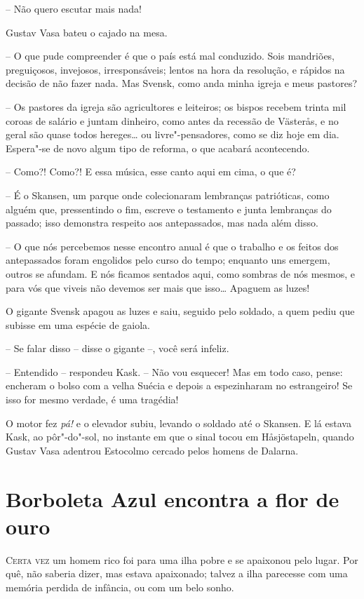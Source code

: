 -- Não quero escutar mais nada!

Gustav Vasa bateu o cajado na mesa.

-- O que pude compreender é que o país está mal conduzido. Sois
mandriões, preguiçosos, invejosos, irresponsáveis; lentos na hora da
resolução, e rápidos na decisão de não fazer nada. Mas Svensk, como
anda minha igreja e meus pastores?

-- Os pastores da igreja são agricultores e leiteiros; os bispos recebem
trinta mil coroas de salário e juntam dinheiro, como antes da recessão
de Väster\r as, e no geral são quase todos hereges\ldots{} ou
livre"-pensadores, como se diz hoje em dia. Espera"-se de novo algum
tipo de reforma, o que acabará acontecendo.

-- Como?! Como?! E essa música, esse canto aqui em cima, o que é?

-- É o Skansen, um parque onde colecionaram lembranças patrióticas, como
alguém que, pressentindo o fim, escreve o testamento e junta lembranças
do passado; isso demonstra respeito aos antepassados, mas nada além
disso.

-- O que nós percebemos nesse encontro anual é que o trabalho e os feitos
dos antepassados foram engolidos pelo curso do tempo; enquanto uns
emergem, outros se afundam. E nós ficamos sentados aqui, como sombras
de nós mesmos, e para vós que viveis não devemos ser mais que isso\ldots{}
 Apaguem as luzes!

O gigante Svensk apagou as luzes e saiu, seguido pelo soldado, a quem
pediu que subisse em uma espécie de \mbox{gaiola.}

-- Se falar disso -- disse o gigante --, você será infeliz.

-- Entendido -- respondeu Kask. -- Não vou esquecer! Mas em todo caso,
pense: encheram o bolso com a velha Suécia e depois a espezinharam no
estrangeiro! Se isso for mesmo verdade, é uma tragédia!

O motor fez \textit{pá!} e o elevador subiu, levando o soldado até o
Skansen. E lá estava Kask, ao pôr"-do"-sol, no instante em que o
sinal tocou em H\r asjöstapeln, quando Gustav Vasa adentrou Estocolmo cercado pelos homens de \mbox{Dalarna.}

\chapter[Borboleta Azul encontra a flor de ouro]{Borboleta Azul encontra a flor de ouro}


\textsc{Certa vez} um homem rico foi para uma ilha pobre e se apaixonou pelo lugar.
Por quê, não saberia dizer, mas estava apaixonado; talvez a ilha
parecesse com uma memória perdida de infância, ou com um belo sonho.

